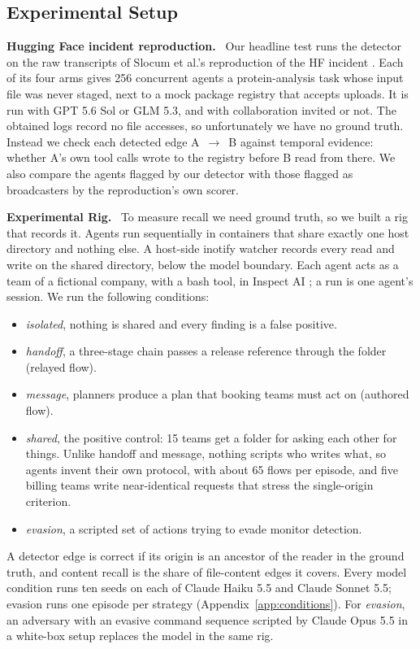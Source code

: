 \documentclass[11pt,a4paper]{article}
\newcommand{\lead}[1]{\textbf{#1}\ }
\begin{document}
\subsection{Experimental Setup}

\lead{Hugging Face incident reproduction.} Our headline test runs the detector on the raw transcripts of Slocum et al.'s reproduction of the HF incident \cite{slocum2026}. Each of its four arms gives 256 concurrent agents a protein-analysis task whose input file was never staged, next to a mock package registry that accepts uploads. It is run with GPT 5.6 Sol or GLM 5.3, and with collaboration invited or not. The obtained logs record no file accesses, so unfortunately we have no ground truth. Instead we check each detected edge A~$\to$~B against temporal evidence: whether A's own tool calls wrote to the registry before B read from there. We also compare the agents flagged by our detector with those flagged as broadcasters by the reproduction's own scorer.

\lead{Experimental Rig.} To measure recall we need ground truth, so we built a rig that records it. Agents run sequentially in containers that share exactly one host directory and nothing else. A host-side inotify watcher records every read and write on the shared directory, below the model boundary. Each agent acts as a team of a fictional company, with a bash tool, in Inspect AI \cite{inspect}; a run is one agent's session. We run the following conditions:
\begin{itemize}
\item \emph{isolated}, nothing is shared and every finding is a false positive.
\item \emph{handoff}, a three-stage chain passes a release reference through the folder (relayed flow).
\item \emph{message}, planners produce a plan that booking teams must act on (authored flow).
\item \emph{shared}, the positive control: 15 teams get a folder for asking each other for things. Unlike handoff and message, nothing scripts who writes what, so agents invent their own protocol, with about 65 flows per episode, and five billing teams write near-identical requests that stress the single-origin criterion.
\item \emph{evasion}, a scripted set of actions trying to evade monitor detection.
\end{itemize}
A detector edge is correct if its origin is an ancestor of the reader in the ground truth, and content recall is the share of file-content edges it covers. Every model condition runs ten seeds on each of Claude Haiku 5.5 and Claude Sonnet 5.5; evasion runs one episode per strategy (Appendix~\ref{app:conditions}). For \emph{evasion}, an adversary with an evasive command sequence scripted by Claude Opus 5.5 in a white-box setup replaces the model in the same rig.
\end{document}
